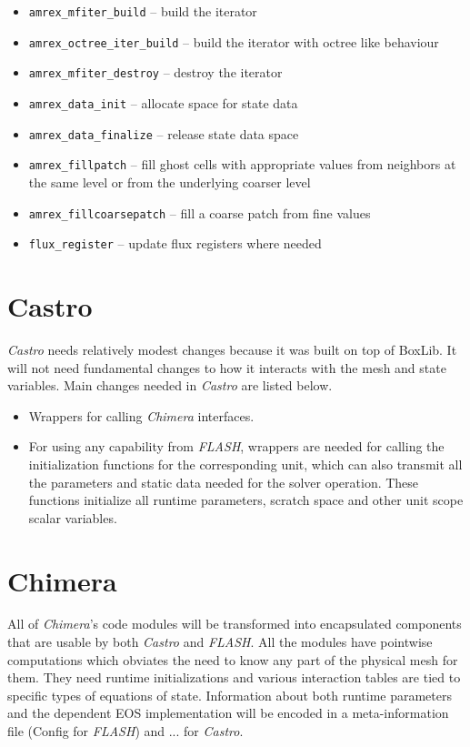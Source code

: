\documentclass{article}
\newcommand{\code}[1]{{\tt#1}}
\newcommand{\flash}{{\it FLASH}\xspace}
\newcommand{\castro}{{\it Castro}\xspace}
\newcommand{\chimera}{{\it Chimera}\xspace}
\begin{document}
\begin{itemize}
\item \code{amrex\_mfiter\_build} -- build the iterator 
\item \code{amrex\_octree\_iter\_build} -- build the iterator with octree like behaviour
\item \code{amrex\_mfiter\_destroy} -- destroy the iterator
\item \code{amrex\_data\_init} -- allocate space for state data
\item \code{amrex\_data\_finalize} -- release state data space
\item \code{amrex\_fillpatch} -- fill ghost cells with appropriate values
  from neighbors at the same level or from the underlying coarser
  level
\item \code{amrex\_fillcoarsepatch} -- fill a coarse patch from fine values
\item \code{flux\_register} -- update flux registers where needed
\end{itemize}


\section{Castro}
\label{sec:castro}
\castro needs relatively modest changes because it was built on top
of BoxLib. It will not need fundamental
changes to how it interacts with the mesh and state variables. Main
changes needed in \castro are listed below.
\begin{itemize}
\item Wrappers for calling \chimera  interfaces.
\item For using any capability from \flash,  wrappers are needed for
calling the initialization functions for the corresponding unit,
which can also transmit all the parameters and static data needed for
the solver operation. These functions initialize all runtime parameters, 
scratch space and other unit scope scalar variables.
\end{itemize}

\section{Chimera}
All of \chimera's code modules will be transformed into encapsulated
components that are usable by both \castro and \flash. All the modules
have pointwise computations which obviates the need to know any part of
the physical mesh for them. They need runtime initializations and
various interaction tables are tied to specific types of equations of
state. Information about both runtime parameters and the dependent EOS
implementation will be encoded in a meta-information file (Config for
\flash) and ... for \castro.
\end{document}
